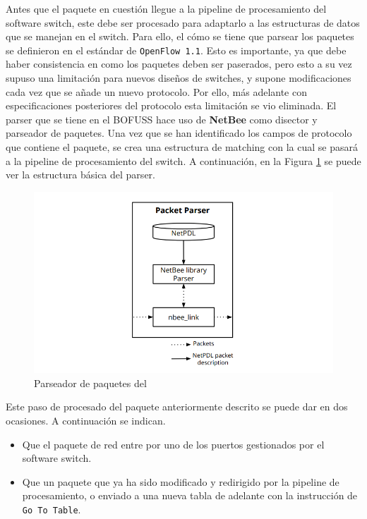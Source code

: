 Antes que el paquete en cuestión llegue a la pipeline de procesamiento del software switch, este debe ser procesado para adaptarlo a las estructuras de datos que se manejan en el switch. Para ello, el cómo se tiene que parsear los paquetes se definieron en el estándar de \texttt{OpenFlow 1.1}. Esto es importante, ya que debe haber consistencia en como los paquetes deben ser paserados, pero esto a su vez supuso una limitación para nuevos diseños de switches, y supone modificaciones cada vez que se añade un nuevo protocolo. Por ello, más adelante con especificaciones posteriores del protocolo esta limitación se vio eliminada. El parser que se tiene en el BOFUSS hace uso de \textbf{NetBee} como disector y parseador de paquetes. Una vez que se han identificado los campos de protocolo que contiene el paquete, se crea una estructura de matching con la cual se pasará a la pipeline de procesamiento del switch. A continuación, en la Figura \ref{fig:bofuss3} se puede ver la estructura básica del parser.

\begin{figure}[ht]
    \centering
    \includegraphics[width=\textwidth]{archivos/img/teoria/bofuss3.png}
    \caption{Parseador de paquetes del  \cite{fernandes2015software}}
    \label{fig:bofuss3}
\end{figure}

Este paso de procesado del paquete anteriormente descrito se puede dar en dos ocasiones. A continuación se indican.

\begin{itemize}
    \item Que el paquete de red entre por uno de los puertos gestionados por el software switch.
    \item Que un paquete que ya ha sido modificado y redirigido por la pipeline de procesamiento, o enviado a una nueva tabla de adelante con la instrucción de \texttt{Go To Table}.
\end{itemize}

